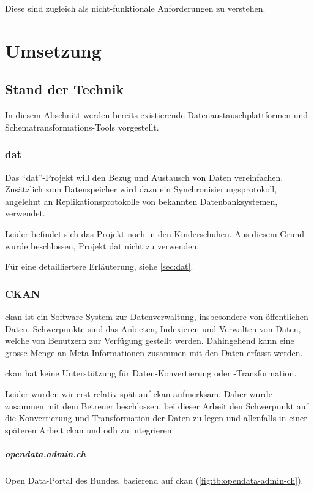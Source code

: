 Diese sind zugleich als nicht-funktionale Anforderungen zu verstehen.

\chapter{Umsetzung}

\section{Stand der Technik} \label{sec:tb:state-of-the-art}

In diesem Abschnitt werden bereits existierende Datenaustauschplattformen und Schematransformations-Tools vorgestellt.

\subsection{dat}
Das ``dat''-Projekt will den Bezug und Austausch von Daten vereinfachen. Zusätzlich zum Datenspeicher wird dazu ein Synchronisierungsprotokoll, angelehnt an Replikationsprotokolle von bekannten Datenbanksystemen, verwendet.

Leider befindet sich das Projekt noch in den Kinderschuhen. Aus diesem Grund wurde beschlossen, Projekt dat nicht zu verwenden.

Für eine detailliertere Erläuterung, siehe \cref{sec:dat}.

\subsection{CKAN}
\gls{ckan} ist ein Software-System zur Datenverwaltung, insbesondere von öffentlichen Daten. Schwerpunkte sind das Anbieten, Indexieren und Verwalten von Daten, welche von Benutzern zur Verfügung gestellt werden. Dahingehend kann eine grosse Menge an Meta-Informationen zusammen mit den Daten erfasst werden. 

\gls{ckan} hat keine Unterstützung für Daten-Konvertierung oder -Transformation.

Leider wurden wir erst relativ spät auf \gls{ckan} aufmerksam. Daher wurde zusammen mit dem Betreuer beschlossen, bei dieser Arbeit den Schwerpunkt auf die Konvertierung und Transformation der Daten zu legen und allenfalls in einer späteren Arbeit \gls{ckan} und \acl{odh} zu integrieren.

\paragraph{opendata.admin.ch}
Open Data-Portal des Bundes, basierend auf \gls{ckan} (\cref{fig:tb:opendata-admin-ch}).

